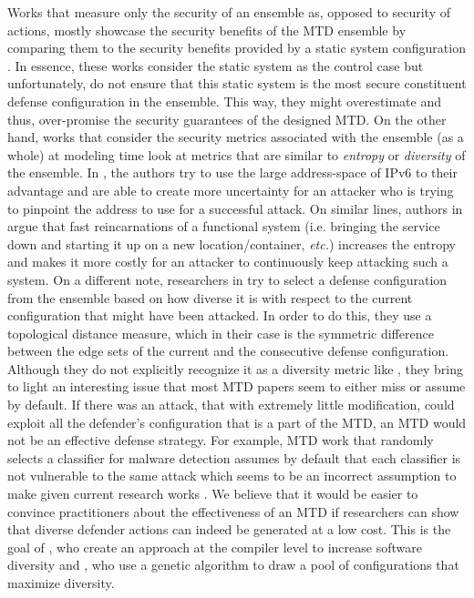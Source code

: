 Works that measure only the security of an ensemble as, opposed to security of actions, mostly showcase the security benefits of the MTD ensemble by comparing them to the security benefits provided by a static system configuration . In essence, these works consider the static system as the control case but unfortunately, do not ensure that this static system is the most secure constituent defense configuration in the ensemble. This way, they might overestimate and thus, over-promise the security guarantees of the designed MTD.
On the other hand, works that consider the security metrics associated with the ensemble (as a whole) at modeling time look at metrics that are similar to {\em entropy} or {\em diversity} of the ensemble. In , the authors try to use the large address-space of IPv6 to their advantage and are able to create more uncertainty for an attacker who is trying to pinpoint the address to use for a successful attack. On similar lines, authors in  argue that fast reincarnations of a functional system (i.e. bringing the service down and starting it up on a new location/container, {\em etc.}) increases the entropy and makes it more costly for an attacker to continuously keep attacking such a system. On a different note, researchers in  try to select a defense configuration from the ensemble based on how diverse it is with respect to the current configuration that might have been attacked. In order to do this, they use a topological distance measure, which in their case is the {symmetric difference} between the edge sets of the {current} and the {consecutive defense} configuration. Although they do not explicitly recognize it as a diversity metric like , they bring to light an interesting issue that most MTD papers seem to either miss or assume by default. If there was an attack, that with extremely little modification, could exploit all the defender's configuration that is a part of the MTD, an MTD would not be an effective defense strategy. For example, MTD work that randomly selects a classifier for malware detection assumes by default that each classifier is not vulnerable to the same attack  which seems to be an incorrect assumption to make given current research works . We believe that it would be easier to convince practitioners about the effectiveness of an MTD if researchers can show that diverse defender actions can indeed be generated at a low cost. This is the goal of , who create an approach at the compiler level to {increase software diversity} and , who use a genetic algorithm to draw a pool of configurations that maximize diversity.

